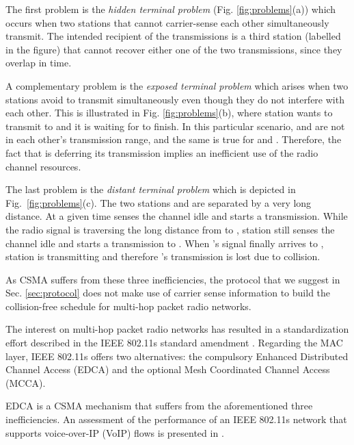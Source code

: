 \documentclass[twocolumn]{svjour3}          \smartqed  \usepackage{graphicx}
\begin{document}
The first problem is the \emph{hidden terminal problem} (Fig. \ref{fig:problems}(a)) which occurs when two stations that cannot carrier-sense each other simultaneously transmit.
The intended recipient of the transmissions is a third station (labelled  in the figure) that cannot recover either one of the two transmissions, since they overlap in time.

A complementary problem is the \emph{exposed terminal problem} which arises when two stations avoid to transmit simultaneously even though they do not interfere with each other.
This is illustrated in Fig. \ref{fig:problems}(b), where station  wants to transmit to  and it is waiting for  to finish.
In this particular scenario,  and  are not in each other's transmission range, and the same is true for  and .
Therefore, the fact that  is deferring its transmission implies an inefficient use of the radio channel resources.

The last problem is the \emph{distant terminal problem} which is depicted in Fig.~\ref{fig:problems}(c).
The two stations  and  are separated by a very long distance.
At a given time  senses the channel idle and starts a transmission.
While the radio signal is traversing the long distance from  to , station  still senses the channel idle and starts a transmission to .
When 's signal finally arrives to , station  is transmitting and therefore 's transmission is lost due to collision.

As CSMA suffers from these three inefficiencies, the protocol that we suggest in Sec. \ref{sec:protocol} does not make use of carrier sense information to build the collision-free schedule for multi-hop packet radio networks.

The interest on multi-hop packet radio networks has resulted in a standardization effort described in the IEEE 802.11s standard amendment \cite{hiertz2010wms}.
Regarding the MAC layer, IEEE 802.11s offers two alternatives: the compulsory Enhanced Distributed Channel Access (EDCA) and the optional Mesh Coordinated Channel Access (MCCA).

EDCA is a CSMA mechanism that suffers from the aforementioned three inefficiencies.
An assessment of the performance of an IEEE 802.11s network that supports voice-over-IP (VoIP) flows is presented in \cite{andreev2010ssv}.
\end{document}
